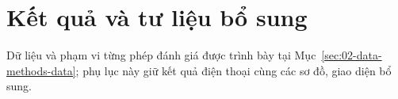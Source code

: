 \chapter{Kết quả và tư liệu bổ sung}\label{chap:supplementary}
Dữ liệu và phạm vi từng phép đánh giá được trình bày tại Mục~\ref{sec:02-data-methods-data}; phụ lục này giữ kết quả điện thoại cùng các sơ đồ, giao diện bổ sung.







